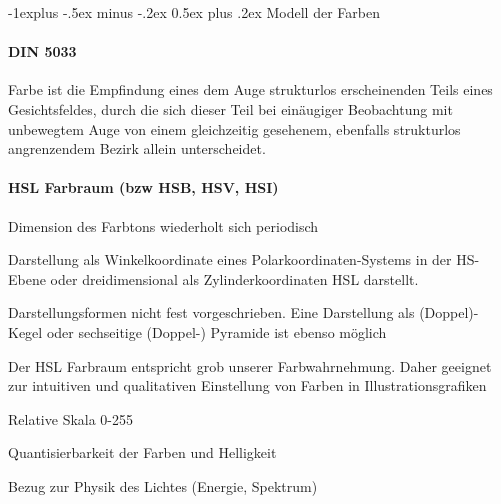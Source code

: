 \documentclass[landscape]{article}
\makeatletter
\renewcommand{\subsection}{\@startsection{subsection}{2}{0mm}%
                                {-1explus -.5ex minus -.2ex}%
                                {0.5ex plus .2ex}%
                                {\normalfont\normalsize\bfseries}}
\makeatother
\begin{document}
\begin{multicols}{3}
  \subsection{Modell der Farben}
  \paragraph{DIN 5033}
  Farbe ist die Empfindung eines dem Auge strukturlos erscheinenden Teils eines Gesichtsfeldes, durch die sich dieser Teil bei einäugiger Beobachtung mit unbewegtem Auge von einem gleichzeitig gesehenem, ebenfalls strukturlos angrenzendem Bezirk allein unterscheidet.
  
  \paragraph{HSL Farbraum (bzw HSB, HSV, HSI)}
  \begin{itemize*}
    \item Dimension des Farbtons wiederholt sich periodisch
    \item Darstellung als Winkelkoordinate eines Polarkoordinaten-Systems in der HS-Ebene oder dreidimensional als Zylinderkoordinaten HSL darstellt.
    \item Darstellungsformen nicht fest vorgeschrieben. Eine Darstellung als (Doppel)-Kegel oder sechseitige (Doppel-) Pyramide ist ebenso möglich
    \item Der HSL Farbraum entspricht grob unserer Farbwahrnehmung. Daher geeignet zur intuitiven und qualitativen Einstellung von Farben in Illustrationsgrafiken
    \item Relative Skala 0-255
    \item Quantisierbarkeit der Farben und Helligkeit
    \item Bezug zur Physik des Lichtes (Energie, Spektrum)
  \end{itemize*}
  

\end{multicols}
\end{document}
